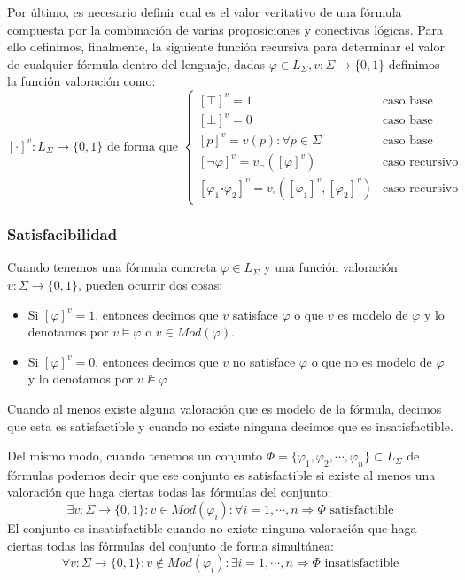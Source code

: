\documentclass[10pt,a4paper,openright]{book}
\begin{document}
Por último, es necesario definir cual es el valor veritativo de una fórmula compuesta por la combinación de varias proposiciones y conectivas lógicas. Para ello definimos, finalmente, la siguiente función recursiva para determinar el valor de cualquier fórmula dentro del lenguaje, dadas $\varphi\in L_\Sigma, v: \Sigma \rightarrow \{0,1\}$ definimos la función valoración como:
$$\left[\cdot \right]^v: L_\Sigma\rightarrow \{0,1\}\mbox{ de forma que }	
\begin{cases}
[\top]^v = 1 & \mbox{caso base} \\
[\bot]^v = 0 & \mbox{caso base} \\
[p]^v = v(p): \forall p \in \Sigma & \mbox{caso base} \\
[\neg \varphi]^v = v_\neg ([\varphi]^v) & \mbox{caso recursivo}\\
[\varphi_1 \square \varphi_2]^v = v_\square ([\varphi_1]^v, [\varphi_2]^v) & \mbox{caso recursivo}
\end{cases}$$

\subsubsection*{Satisfacibilidad}
Cuando tenemos una fórmula concreta $\varphi \in L_\Sigma$ y una función valoración $v: \Sigma \rightarrow \{0,1\}$, pueden ocurrir dos cosas:
\begin{itemize}
\item Si $[\varphi]^v = 1$, entonces decimos que $v$ satisface $\varphi$ o que $v$ es modelo de $\varphi$ y lo denotamos por $v\models \varphi$ o $v\in Mod(\varphi)$. 

\item Si $[\varphi]^v = 0$, entonces decimos que $v$ no satisface $\varphi$ o que no es modelo de $\varphi$ y lo denotamos por $v\nvDash \varphi$
\end{itemize}

Cuando al menos existe alguna valoración que es modelo de la fórmula, decimos que esta es satisfactible y cuando no existe ninguna decimos que es insatisfactible.

Del mismo modo, cuando tenemos un conjunto $\Phi = \{\varphi_1, \varphi_2, \cdots, \varphi_n\}\subset L_\Sigma$ de fórmulas podemos decir que ese conjunto es satisfactible si existe al menos una valoración que haga ciertas todas las fórmulas del conjunto:
$$\exists v: \Sigma \rightarrow \{0,1\}: v\in Mod(\varphi_i): \forall i = 1, \cdots, n \Rightarrow \Phi \mbox{ satisfactible}$$
El conjunto es insatisfactible cuando no existe ninguna valoración que haga ciertas todas las fórmulas del conjunto de forma simultánea:
$$\forall v: \Sigma \rightarrow \{0,1\}: v\notin Mod(\varphi_i): \exists i = 1, \cdots, n \Rightarrow \Phi \mbox{ insatisfactible}$$
\end{document}
